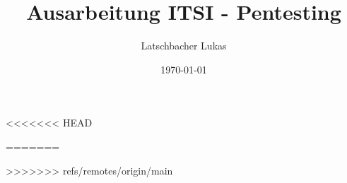 \documentclass{article}
\title{Ausarbeitung ITSI - Pentesting}
\author{Latschbacher Lukas}
\date{\today}
\begin{document}
<<<<<<< HEAD
	\maketitle
	\newpage
	\tableofcontents
	\newpage
	
	
	 
=======
\maketitle
\newpage
\tableofcontents
\newpage




>>>>>>> refs/remotes/origin/main
\end{document}
